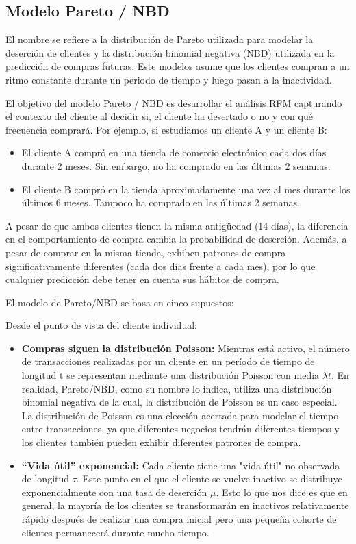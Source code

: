\subsection{Modelo Pareto / NBD}

El nombre se refiere a la distribución de Pareto utilizada para modelar la deserción de clientes y la distribución binomial negativa (NBD) utilizada en la predicción de compras futuras. Este modelos asume que los clientes compran a un ritmo constante durante un periodo de tiempo y luego pasan a la inactividad.

	El objetivo del modelo Pareto / NBD es desarrollar el análisis RFM capturando el contexto del cliente al decidir si, el cliente ha desertado o no y con qué frecuencia comprará. Por ejemplo, si estudiamos un cliente A y un cliente B: 

\begin{itemize}
	\item El cliente A compró en una tienda de comercio electrónico cada dos días durante 2 meses. Sin embargo, no ha comprado en las últimas 2 semanas.
	\item El cliente B compró en la tienda aproximadamente una vez al mes durante los últimos 6 meses. Tampoco ha comprado en las últimas 2 semanas.
\end{itemize}

A pesar de que ambos clientes tienen la misma antigüedad (14 días), la diferencia en el comportamiento de compra cambia la probabilidad de deserción. Además, a pesar de comprar en la misma tienda, exhiben patrones de compra significativamente diferentes (cada dos días frente a cada mes), por lo que cualquier predicción debe tener en cuenta sus hábitos de compra.

El modelo de Pareto/NBD se basa en cinco supuestos:

Desde el punto de vista del cliente individual:

\begin{itemize}
	\item \textbf{Compras siguen la distribución Poisson:} Mientras está activo, el número de transacciones realizadas por un cliente en un período de tiempo de longitud t se representan mediante una distribución Poisson con media $\lambda t$. En realidad, Pareto/NBD, como su nombre lo indica, utiliza una distribución binomial negativa de la cual, la distribución de Poisson es un caso especial. La distribución de Poisson es una elección acertada para modelar el tiempo entre transacciones, ya que diferentes negocios tendrán diferentes tiempos y los clientes también pueden exhibir diferentes patrones de compra.
	\item \textbf{“Vida útil” exponencial:} Cada cliente tiene una "vida útil" no observada de longitud $\tau$. Este punto en el que el cliente se vuelve inactivo se distribuye exponencialmente con una tasa de deserción $\mu$. Esto lo que nos dice es que en general, la mayoría de los clientes se transformarán en inactivos relativamente rápido después de realizar una compra inicial pero una pequeña cohorte de clientes permanecerá durante mucho tiempo.
\end{itemize}

